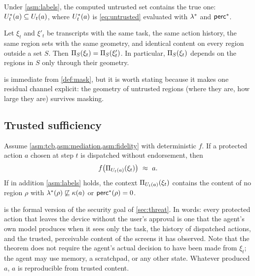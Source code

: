 \begin{lemma}\label{lem:overapprox}
Under \cref{asm:labels}, the computed untrusted set contains the true one: $U^*_t(a)\subseteq U_t(a)$, where $U^*_t(a)$ is \cref{eq:untrusted} evaluated with $\lambda^*$ and $\mathsf{perc}^*$.
\end{lemma}

\begin{lemma}\label{lem:projection}
Let $\xi_t$ and $\xi'_t$ be transcripts with the same task, the same action history, the same region sets with the same geometry, and identical content on every region outside a set $S$. Then $\Pi_S(\xi_t)=\Pi_S(\xi'_t)$. In particular, $\Pi_S(\xi_t)$ depends on the regions in $S$ only through their geometry.
\end{lemma}

 is immediate from \cref{def:mask}, but it is worth stating because it makes one residual channel explicit: the geometry of untrusted regions (where they are, how large they are) survives masking.

\subsection{Trusted sufficiency}

\begin{theorem}\label{thm:sufficiency}
Assume \cref{asm:tcb,asm:mediation,asm:fidelity} with deterministic $f$. If a protected action $a$ chosen at step $t$ is dispatched without endorsement, then
\begin{equation}\label{eq:sufficiency}
  f\bigl(\Pi_{U_t(a)}(\xi_t)\bigr)\ \approx\ a .
\end{equation}
If in addition \cref{asm:labels} holds, the context $\Pi_{U_t(a)}(\xi_t)$ contains the content of no region $\rho$ with $\lambda^*(\rho)\not\sqsubseteq\kappa(a)$ or $\mathsf{perc}^*(\rho)=0$.
\end{theorem}

 is the formal version of the security goal of \cref{sec:threat}. In words: every protected action that leaves the device without the user's approval is one that the agent's own model produces when it sees only the task, the history of dispatched actions, and the trusted, perceivable content of the screens it has observed. Note that the theorem does not require the agent's actual decision to have been made from $\xi_t$; the agent may use memory, a scratchpad, or any other state. Whatever produced $a$, $a$ is reproducible from trusted content.

